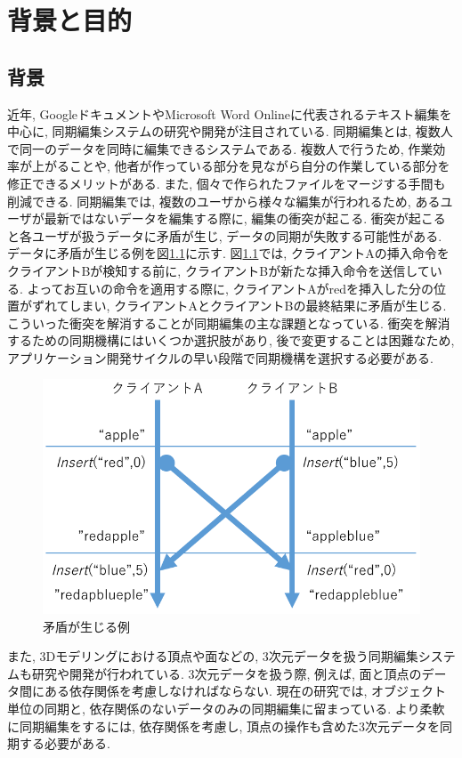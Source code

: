 \chapter{背景と目的}\label{chap:background}

\section{背景}
近年, GoogleドキュメントやMicrosoft Word Onlineに代表されるテキスト編集を中心に, 同期編集システムの研究や開発が注目されている.
同期編集とは, 複数人で同一のデータを同時に編集できるシステムである.
複数人で行うため, 作業効率が上がることや, 他者が作っている部分を見ながら自分の作業している部分を修正できるメリットがある.
また, 個々で作られたファイルをマージする手間も削減できる.
同期編集では, 複数のユーザから様々な編集が行われるため, あるユーザが最新ではないデータを編集する際に, 編集の衝突が起こる. 衝突が起こると各ユーザが扱うデータに矛盾が生じ, データの同期が失敗する可能性がある. データに矛盾が生じる例を図\ref{mujyun}に示す. 図\ref{mujyun}では, クライアントAの挿入命令をクライアントBが検知する前に, クライアントBが新たな挿入命令を送信している. よってお互いの命令を適用する際に, クライアントAがredを挿入した分の位置がずれてしまい, クライアントAとクライアントBの最終結果に矛盾が生じる.
こういった衝突を解消することが同期編集の主な課題となっている.
衝突を解消するための同期機構にはいくつか選択肢があり, 後で変更することは困難なため, アプリケーション開発サイクルの早い段階で同期機構を選択する必要がある.
\begin{figure}[htbp]
  \begin{center}
    \includegraphics[scale=0.4]{images/mujyun}
    \caption{矛盾が生じる例}
    \label{mujyun}
  \end{center}
\end{figure}
\par
また, 3Dモデリングにおける頂点や面などの, 3次元データを扱う同期編集システムも研究や開発が行われている. 3次元データを扱う際, 例えば, 面と頂点のデータ間にある依存関係を考慮しなければならない. 現在の研究では, オブジェクト単位の同期と, 依存関係のないデータのみの同期編集に留まっている. より柔軟に同期編集をするには, 依存関係を考慮し, 頂点の操作も含めた3次元データを同期する必要がある.

